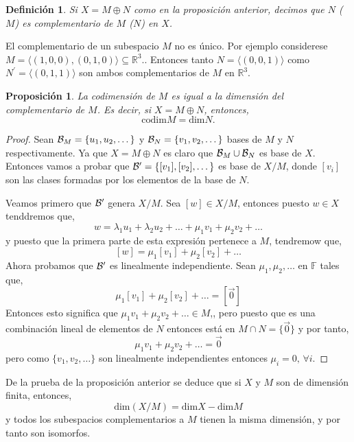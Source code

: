 \documentclass[12pt]{book}
\newtheorem{defn}{\bf Definición}[chapter]
\newtheorem{prop}{\bf Proposición}[chapter]
\begin{document}
\begin{defn} Si $X=M\oplus N$ como en la proposici\'on anterior, decimos que $N$ ($M$) es 
complementario de $M$ ($N$) en $X$.
\end{defn}
 El complementario de un subespacio $M$ no es \'unico. Por ejemplo 
considerese $M=\langle(1,0,0),(0,1,0)\rangle\subseteq\mathbb{R}^3$.. Entonces tanto 
$N=\langle(0,0,1)\rangle$ como $N^\prime=\langle(0,1,1)\rangle$ son ambos complementarios de 
$M$ en $\mathbb{R}^3$.
\begin{prop} La codimensi\'on de $M$ es igual a la dimensi\'on del complementario de $M$. Es 
decir, si $X=M\oplus N$, entonces,
$$\textrm{codim} M = \textrm{dim} N.$$
\end{prop}
 \begin{proof}
Sean ${\cal B}_M =\{u_1,u_2,\dots\}$ y ${\cal B}_N =\{v_1,v_2,\dots\}$ bases de $M$ y $N$ 
respectivamente. Ya que $X=M\oplus N$ es claro que ${\cal B}_M\cup{\cal B}_N$ es base de $X$. 
Entonces vamos a probar que ${\cal B}^\prime=\{[v_1],[v_2],\dots\}$ es base de $X/M$, donde $
[v_i]$ son las clases formadas  por los elementos de la base de $N$. 
 
 Veamos primero que ${\cal B}^\prime$ genera $X/M$. Sea $[w]\in X/M$, entonces puesto $w\in X$ 
tenddremos que,
 $$w=\lambda_1 u_1 + \lambda_2 u_2+\dots + \mu_1 v_1 + \mu_2v_2+\dots$$
 y puesto que la primera parte de esta expresi\'on pertenece a $M$, tendremow que,
 $$[w]= \mu_1[v_1]+\mu_2[v_2] +\dots$$
Ahora probamos que ${\cal B}^\prime$ es linealmente independiente. Sean $\mu_1,\mu_2,\dots$ 
en $\mathbb{F}$ tales que,
$$ \mu_1[v_1]+\mu_2 [v_2] +\dots =[\vec 0]$$
Entonces esto significa que  $\mu_1 v_1 + \mu_2 v_2 +\dots \in M$,, pero puesto que es una 
combinaci\'on lineal de elementos de $N$ entonces est\'a en $M\cap N=\{ \vec 0\}$ y por tanto,
$$ \mu_1v_1+\mu_2 v_2 +\dots =\vec 0$$
pero como $\{v_1,v_2,\dots\}$ son linealmente independientes entonces $\mu_i=0,\,\forall i$.
\end{proof}


 De la prueba de la proposici\'on anterior se deduce que si $X$ y $M$ son de 
dimensi\'on finita, entonces,
$$\textrm{dim}(X/M) = \textrm{dim} X - \textrm{dim}M$$
y todos los subespacios complementarios a $M$ tienen la misma dimensi\'on, y por tanto son 
isomorfos.
 
\end{document}
